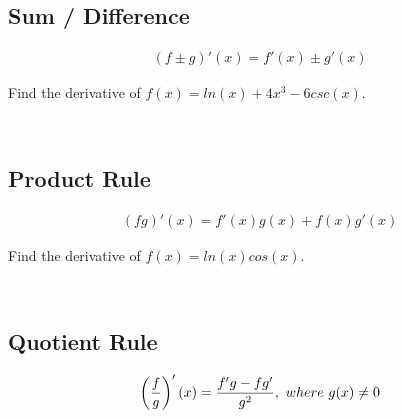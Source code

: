 \subsection{Sum / Difference}

\begin{theorem}
    \begin{align}
        (f \pm g)'(x) = f'(x) \pm g'(x)
    \end{align}
\end{theorem}

\begin{exercise}\nonumber
    Find the derivative of $ f(x) = ln(x) + 4x^3 - 6csc(x) $.

    \begin{align}
        \\
        \\
    \end{align}
\end{exercise}

\subsection{Product Rule}

\begin{theorem}
    \begin{align}
        (fg)'(x) = f'(x)g(x) + f(x)g'(x)
    \end{align}
\end{theorem}

\begin{exercise}\nonumber
    Find the derivative of $ f(x) = ln(x)cos(x) $.

    \begin{align}
        \\
        \\
    \end{align}
\end{exercise}

\subsection{Quotient Rule}

\begin{theorem}
    \begin{align}
        \left({f \over g}\right)'(x) = {f'g - fg' \over g^2},\ where\ g(x) \neq 0
    \end{align}
\end{theorem}

